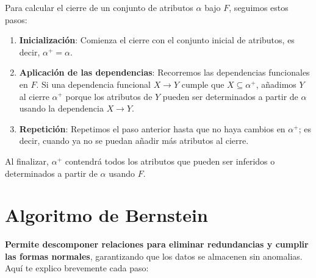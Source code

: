 \documentclass{article}
\begin{document}
Para calcular el cierre de un conjunto de atributos $\alpha$ bajo $F$, seguimos estos pasos:

\begin{enumerate}
    \item \textbf{Inicialización}: Comienza el cierre con el conjunto inicial de atributos, es decir, $\alpha^+ = \alpha$.
    
    \item \textbf{Aplicación de las dependencias}: Recorremos las dependencias funcionales en $F$. Si una dependencia funcional $X \rightarrow Y$ cumple que $X \subseteq \alpha^+$, añadimos $Y$ al cierre $\alpha^+$ porque los atributos de $Y$ pueden ser determinados a partir de $\alpha$ usando la dependencia $X \rightarrow Y$.
    
    \item \textbf{Repetición}: Repetimos el paso anterior hasta que no haya cambios en $\alpha^+$; es decir, cuando ya no se puedan añadir más atributos al cierre.
\end{enumerate}

Al finalizar, $\alpha^+$ contendrá todos los atributos que pueden ser inferidos o determinados a partir de $\alpha$ usando $F$.

\newpage

\section{Algoritmo de Bernstein}
\textbf{Permite descomponer relaciones para eliminar redundancias y cumplir las formas normales}, garantizando que los datos se almacenen sin anomalias. Aquí te explico brevemente cada paso:
\end{document}

